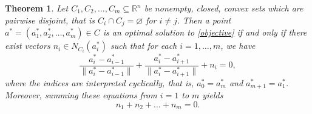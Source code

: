 \documentclass[12pt]{article}
\theoremstyle{plain}
\newtheorem{theorem}{Theorem}[section]
\theoremstyle{definition}
\begin{document}
\begin{theorem}\label{thm:optimality}
	Let $C_1, C_2, \ldots, C_m \subseteq \mathbb{R}^n$ be nonempty, closed, convex sets which are pairwise disjoint, that is  $C_i \cap C_j =\varnothing$ for $i \ne j$. Then a point 
	$a^* = (a_1^* \allowbreak, a_2^* \allowbreak, \dots \allowbreak, a_m^*) \in C$	is an optimal solution to \eqref{objective} if and only if there exist vectors 
	$n_i\in N_{C_i}(a_i^*)$  such that for each $i=1, \ldots, m$, we have
	\begin{equation}
		\frac{a_i^* - a_{i-1}^*}{\|a_i^* - a_{i-1}^*\|} + \frac{a_i^* - a_{i+1}^*}{\|a_i^* - a_{i+1}^*\|} + n_i = 0,
		\label{optimality_vector}
	\end{equation}
	where the indices are interpreted cyclically, that is, $a_0^*=a_m^*$ and $a_{m+1}^*=a_1^*$. Moreover, summing these equations from $i=1$ to $m$ yields
	\begin{equation}\label{normal_vector}
		n_1+n_2+\dots+n_m=0.
	\end{equation}
\end{theorem}
\end{document}
